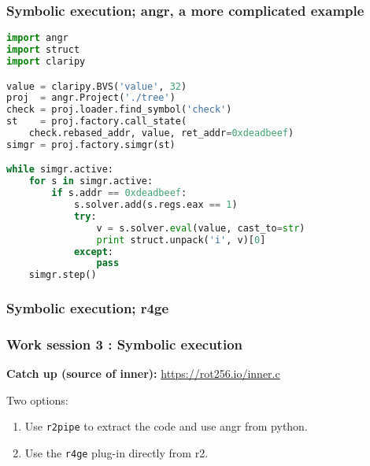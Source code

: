 \documentclass{beamer}
\begin{document}
\begin{frame}[fragile]
\frametitle{Symbolic execution; angr, a more complicated example}
\begin{lstlisting}[language=python]
import angr
import struct
import claripy

value = claripy.BVS('value', 32)
proj  = angr.Project('./tree')
check = proj.loader.find_symbol('check')
st    = proj.factory.call_state(
    check.rebased_addr, value, ret_addr=0xdeadbeef)
simgr = proj.factory.simgr(st)

while simgr.active:
    for s in simgr.active:
        if s.addr == 0xdeadbeef:
            s.solver.add(s.regs.eax == 1)
            try:
                v = s.solver.eval(value, cast_to=str)
                print struct.unpack('i', v)[0]
            except:
                pass
    simgr.step()
\end{lstlisting}
\end{frame}

\begin{frame}
\frametitle{Symbolic execution; r4ge}
\end{frame}

\begin{frame}
\frametitle{Work session 3 : Symbolic execution}

\textbf{Catch up (source of inner):} \url{https://rot256.io/inner.c}

\vspace{3mm}

Two options:

\begin{enumerate}
    \item Use \texttt{r2pipe} to extract the code and use angr from python.
    \item Use the \texttt{r4ge} plug-in directly from r2.
\end{enumerate}

\end{frame}
\end{document}
